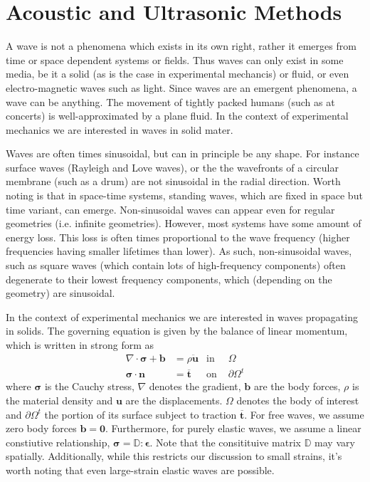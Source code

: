 \chapter{Acoustic and Ultrasonic Methods}



A wave is not a phenomena which exists in its own right, rather it emerges from time or space dependent systems or fields. Thus waves can only exist in some media, be it a solid (as is the case in experimental mechancis) or fluid, or even electro-magnetic waves such as light. Since waves are an emergent phenomena, a wave can be anything. The movement of tightly packed humans (such as at concerts) is well-approximated by a plane fluid. In the context of experimental mechanics we are interested in waves in solid mater.

Waves are often times sinusoidal, but can in principle be any shape. For instance surface waves (Rayleigh and Love waves), or the the wavefronts of a circular membrane (such as a drum) are not sinusoidal in the radial direction. Worth noting is that in space-time systems, standing waves, which are fixed in space but time variant, can emerge. Non-sinusoidal waves can appear even for regular geometries (i.e. infinite geometries). However, most systems have some amount of energy loss. This loss is often times proportional to the wave frequency (higher frequencies having smaller lifetimes than lower). As such, non-sinusoidal waves, such as square waves (which contain lots of high-frequency components) often degenerate to their lowest frequency components, which (depending on the geometry) are sinusoidal.

In the context of experimental mechanics we are interested in waves propagating in solids. The governing equation is given by the balance of linear momentum, which is written in strong form as
\begin{align}
	\nabla \cdot \boldsymbol{\sigma} + \boldsymbol{b} 	& = \rho \ddot{\boldsymbol{u}} 	& \text{in } & \Omega \label{eq:linear_momentum}\\
	\boldsymbol{\sigma}\cdot\boldsymbol{n}				& = \overline{\boldsymbol{t}}				& \text{on } & \partial\Omega^t
\end{align}
where $\boldsymbol{\sigma}$ is the Cauchy stress, $\nabla$ denotes the gradient, $\boldsymbol{b}$ are the body forces, $\rho$ is the material density and $\boldsymbol{u}$ are the displacements. $\Omega$ denotes the body of interest and $\partial\Omega^t$ the portion of its surface subject to traction $\overline{\boldsymbol{t}}$. For free waves, we assume zero body forces $\boldsymbol{b} = \boldsymbol{0}$. Furthermore, for purely elastic waves, we assume a linear constiutive relationship, $\boldsymbol{\sigma}=\mathbb{D}\mathrel{:}\boldsymbol{\epsilon}$. Note that the consitituive matrix $\mathbb{D}$ may vary spatially. Additionally, while this restricts our discussion to small strains, it's worth noting that even large-strain elastic waves are possible.

